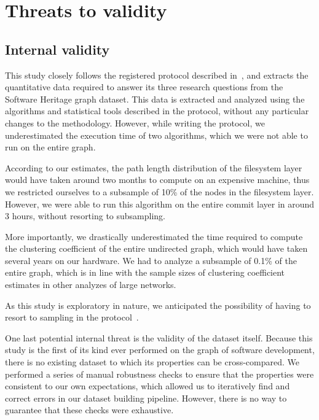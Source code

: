 \section{Threats to validity}%
\label{sec:topology-threats}

\subsection{Internal validity}

This study closely follows the registered protocol described
in~\cite{msr-2020-topology}, and extracts the quantitative data required to
answer its three research questions from the Software Heritage graph dataset.
This data is extracted and analyzed using the algorithms and statistical tools
described in the protocol, without any particular changes to the methodology.
However, while writing the protocol, we underestimated the execution time of
two algorithms, which we were not able to run on the entire graph.

According to our estimates, the path length distribution of the filesystem
layer would have taken around two months to compute on an expensive machine,
thus we restricted ourselves to a subsample of 10\% of the nodes in the
filesystem layer. However, we were able to run this algorithm on the entire
commit layer in around 3 hours, without resorting to subsampling.

More importantly, we drastically underestimated the time required to compute
the clustering coefficient of the entire undirected graph, which would have
taken several years on our hardware. We had to analyze a subsample of
0.1\% of the entire graph, which is in line with the sample sizes of
clustering coefficient estimates in other analyzes of large
networks.

As this study is exploratory in nature, we anticipated the possibility of
having to resort to sampling in the
protocol~\cite[Section 7]{msr-2020-topology}.

One last potential internal threat is the validity of the dataset itself.
Because this study is the first of its kind ever performed on the graph of
software development, there is no existing dataset to which its properties can
be cross-compared. We performed a series of manual robustness checks to ensure
that the properties were consistent to our own expectations, which allowed us
to iteratively find and correct errors in our dataset building pipeline.
However, there is no way to guarantee that these checks were exhaustive.

